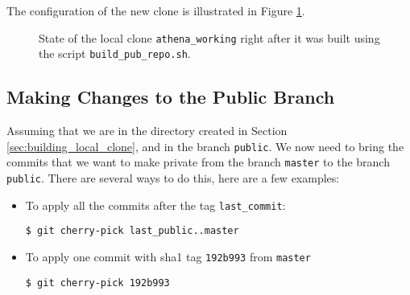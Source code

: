 \documentclass[11pt]{article}
\begin{document}
The configuration of the new clone is illustrated in Figure
\ref{fig:local_repo}.

\begin{figure} \centering
\resizebox{5in}{!}{}
\caption{State of the local clone \texttt{athena\_working} right after
it was built using the script
\texttt{build\_pub\_repo.sh}.\label{fig:local_repo}}
\end{figure}

\subsection{Making Changes to the Public Branch}
\label{sec:make_changes_to_the_public_branch}
Assuming that we are in the directory created in Section
\ref{sec:building_local_clone}, and in the branch \texttt{public}.  We
now need to bring the commits that we want to make private from the
branch \texttt{master} to the branch \texttt{public}.  There are
several ways to do this, here are a few examples:
\begin{itemize}
\item To apply all the commits after the tag \texttt{last\_commit}:
\begin{verbatim}
$ git cherry-pick last_public..master
\end{verbatim}
\item To apply one commit with sha1 tag \texttt{192b993} from \texttt{master}
\begin{verbatim}
$ git cherry-pick 192b993
\end{verbatim}
\end{itemize}
\end{document}

